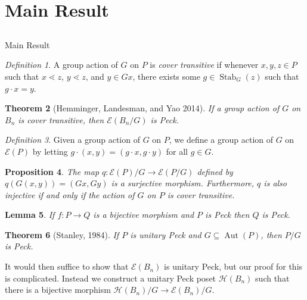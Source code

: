 \documentclass{beamer}
\newtheorem{thm}{Theorem}
\newtheorem{lem}[thm]{Lemma}
\newtheorem{prop}[thm]{Proposition}
\theoremstyle{remark}
\newtheorem{defn}[thm]{Definition}
\def\Stab{\operatorname{Stab}}
\begin{document}

\section{Main Result}
\subsection{}

\begin{frame}{Main Result}
\begin{defn}
A group action of $G$ on $P$ is \textit{cover transitive} if whenever $x,y,z\in P$ such that $x\lessdot z$, $y\lessdot z$, and $y\in Gx$, there exists some $g\in \Stab_G(z)$ such that $g\cdot x = y$.
\end{defn}

\begin{thm}[Hemminger, Landesman, and Yao 2014]
If a group action of $G$ on $B_n$ is cover transitive, then $\mathcal{E}(B_n/G)$ is Peck.
\end{thm}
\end{frame}








\begin{frame}
\begin{defn}
Given a group action of $G$ on $P$, we define a group action of $G$ on $\mathcal{E}(P)$ by letting $g\cdot (x,y) = (g\cdot x,g\cdot y)$ for all $g\in G$.
\end{defn}
\pause
\begin{prop}
The map $q\colon \mathcal{E}(P)/G\rightarrow \mathcal{E}(P/G)$ defined by $q(G(x,y)) = (Gx,Gy)$ is a surjective morphism.  Furthermore, $q$ is also injective if and only if the action of $G$ on $P$ is cover transitive.
\end{prop}

\begin{lem}
If $f:P\rightarrow Q$ is a bijective morphism and $P$ is Peck then $Q$ is Peck.
\end{lem}
\end{frame}









\begin{frame}
\begin{thm}[Stanley, 1984]
If $P$ is unitary Peck and $G\subseteq\operatorname{Aut}(P)$, then $P/G$ is Peck.
\end{thm}
It would then suffice to show that $\mathcal{E}(B_n)$ is unitary Peck, but our proof for this is complicated.  Instead we construct a unitary Peck poset $\mathcal{H}(B_n)$ such that there is a bijective morphism $\mathcal{H}(B_n)/G\rightarrow \mathcal{E}(B_n)/G$.

\end{frame}
\end{document}
